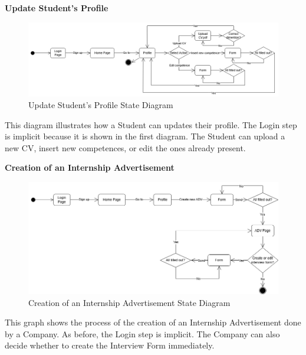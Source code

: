 \textbf{Update Student's Profile}\newline
\begin{figure}[H]
    \centering
    \includegraphics[width=15cm]{Images/State_Diagrams/RASD-SD-Update student profile.drawio.png}
    \caption{Update Student's Profile State Diagram}
\end{figure}
This diagram illustrates how a Student can updates their profile. The Login step is implicit because it is shown in the first diagram. The Student can upload a new CV, insert new competences, or edit the ones already present. 
\newline

\textbf{Creation of an Internship Advertisement}\newline
\begin{figure}[H]
    \centering
    \includegraphics[width=15cm]{Images/State_Diagrams/RASD-SD-create adv.drawio.png}
    \caption{Creation of an Internship Advertisement State Diagram}
\end{figure}
This graph shows the process of the creation of an Internship Advertisement done by a Company. As before, the Login step is implicit. The Company can also decide whether to create the Interview Form immediately.
\newline

